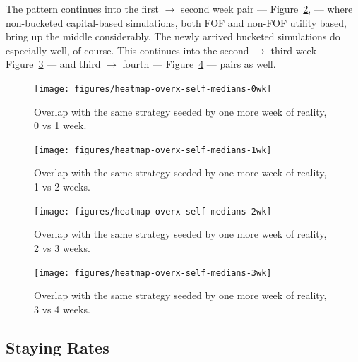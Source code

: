 \documentclass[10pt,oneside]{memoir}
\begin{document}
\begin{Spacing}{2}
The pattern continues into the first $\rightarrow$ second week pair --- Figure~\ref{figure:heatmap-overx-self-medians-1wk}, --- where non-bucketed capital-based simulations, both FOF and non-FOF utility based, bring up the middle considerably.  The newly arrived bucketed simulations do especially well, of course.  This continues into the second $\rightarrow$ third week --- Figure~\ref{figure:heatmap-overx-self-medians-2wk} --- and third $\rightarrow$ fourth --- Figure~\ref{figure:heatmap-overx-self-medians-3wk} --- pairs as well.



\begin{figure}
\begin{center}
    \texttt{[image: figures/heatmap-overx-self-medians-0wk]}
    \caption{Overlap with the same strategy seeded by one more week of reality, 0 vs 1 week.}
    \label{figure:heatmap-overx-self-medians-0wk}
\end{center}
\end{figure}

\begin{figure}
\begin{center}
    \texttt{[image: figures/heatmap-overx-self-medians-1wk]}
    \caption{Overlap with the same strategy seeded by one more week of reality, 1 vs 2 weeks.}
    \label{figure:heatmap-overx-self-medians-1wk}
\end{center}
\end{figure}

\begin{figure}
\begin{center}
    \texttt{[image: figures/heatmap-overx-self-medians-2wk]}
    \caption{Overlap with the same strategy seeded by one more week of reality, 2 vs 3 weeks.}
    \label{figure:heatmap-overx-self-medians-2wk}
\end{center}
\end{figure}

\begin{figure}
\begin{center}
    \texttt{[image: figures/heatmap-overx-self-medians-3wk]}
    \caption{Overlap with the same strategy seeded by one more week of reality, 3 vs 4 weeks.}
    \label{figure:heatmap-overx-self-medians-3wk}
\end{center}
\end{figure}
\pagebreak \subsection{Staying Rates}
\label{stayingrates}


\end{Spacing}
\end{document}
